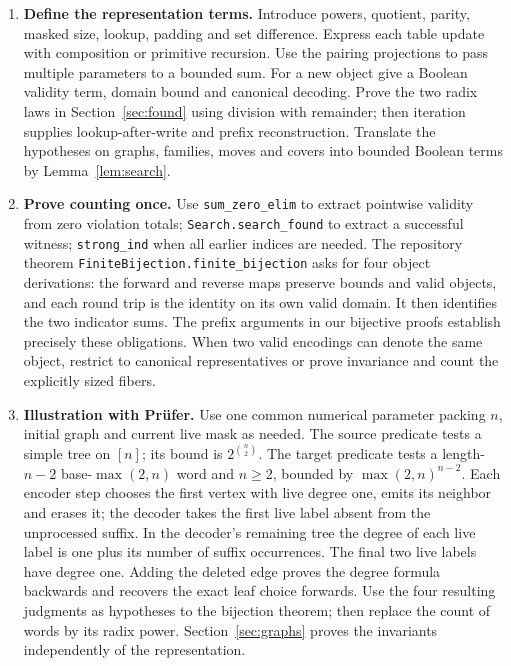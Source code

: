 \begin{enumerate}
\item \textbf{Define the representation terms.} Introduce powers, quotient, parity, masked size, lookup, padding and set difference. Express each table update with composition or primitive recursion. Use the pairing projections to pass multiple parameters to a bounded sum. For a new object give a Boolean validity term, domain bound and canonical decoding. Prove the two radix laws in Section~\ref{sec:found} using division with remainder; then iteration supplies lookup-after-write and prefix reconstruction. Translate the hypotheses on graphs, families, moves and covers into bounded Boolean terms by Lemma~\ref{lem:search}.
\item \textbf{Prove counting once.} Use \texttt{sum\_zero\_elim} to extract pointwise validity from zero violation totals; \texttt{Search.search\_found} to extract a successful witness; \texttt{strong\_ind} when all earlier indices are needed. The repository theorem \texttt{FiniteBijection.finite\_bijection} asks for four object derivations: the forward and reverse maps preserve bounds and valid objects, and each round trip is the identity on its own valid domain. It then identifies the two indicator sums. The prefix arguments in our bijective proofs establish precisely these obligations. When two valid encodings can denote the same object, restrict to canonical representatives or prove invariance and count the explicitly sized fibers.
\item \textbf{Illustration with Pr\"ufer.} Use one common numerical parameter packing $n$, initial graph and current live mask as needed. The source predicate tests a simple tree on $[n]$; its bound is $2^{\binom n2}$. The target predicate tests a length-$n-2$ base-$\max(2,n)$ word and $n\ge2$, bounded by $\max(2,n)^{n-2}$. Each encoder step chooses the first vertex with live degree one, emits its neighbor and erases it; the decoder takes the first live label absent from the unprocessed suffix. In the decoder's remaining tree the degree of each live label is one plus its number of suffix occurrences. The final two live labels have degree one. Adding the deleted edge proves the degree formula backwards and recovers the exact leaf choice forwards. Use the four resulting judgments as hypotheses to the bijection theorem; then replace the count of words by its radix power. Section~\ref{sec:graphs} proves the invariants independently of the representation.

\end{enumerate}
